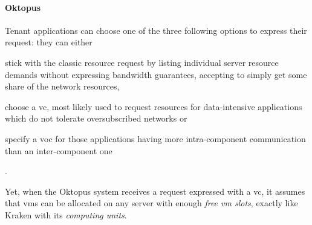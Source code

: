 \paragraph{Oktopus \texorpdfstring{\cite{oktopus}}{}}
Tenant applications can choose one of the three following options to express their request: they can either
\begin{mylist}
    \item stick with the classic resource request by listing individual server resource demands without expressing bandwidth guarantees, accepting to simply get some share of the network resources,
    \item choose a \gls{vc}, most likely used to request resources for data-intensive applications which do not tolerate oversubscribed networks or
    \item specify a \gls{voc} for those applications having more intra-component communication than an inter-component one
\end{mylist}.\par
Yet, when the Oktopus \cite{oktopus} system receives a request expressed with a \gls{vc}, it assumes that \glspl{vm} can be allocated on any server with enough \textit{free \gls{vm} slots}, exactly like Kraken \cite{kraken} with its \textit{computing units}.